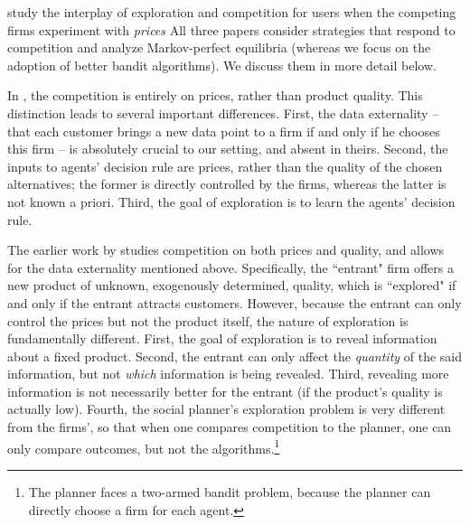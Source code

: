 \citet{bergemann1997market,bergemann2000experimentation,keller2003price} study the interplay of exploration and competition for users when the competing firms experiment with \emph{prices}
All three papers consider strategies that respond to competition and analyze Markov-perfect equilibria (whereas we focus on the adoption of better bandit algorithms). We discuss them in more detail below.

In \citet{keller2003price}, the competition is entirely on prices, rather than product quality. This distinction leads to several important differences. First, the data externality -- that each customer brings a new data point to a firm if and only if he chooses this firm -- is absolutely crucial to our setting, and absent in theirs. Second, the inputs to agents' decision rule are prices, rather than the quality of the chosen alternatives; the former is directly controlled by the firms, whereas the latter is not known a priori. Third, the goal of exploration is to learn the agents' decision rule.

The earlier work by \citet{bergemann1997market,bergemann2000experimentation} studies competition on both prices and quality, and allows for the data externality mentioned above. Specifically, the ``entrant" firm offers a new product of unknown, exogenously determined, quality, which is ``explored" if and only if the entrant attracts customers. However, because the entrant can only control the prices but not the product itself, the nature of exploration is fundamentally different. First, the goal of exploration is to reveal information about a fixed product. Second, the entrant can only affect the \emph{quantity} of the said information, but not \emph{which} information is being revealed. Third, revealing more information is not necessarily better for the entrant (if the product's quality is actually low). Fourth, the social planner's exploration problem is very different from the firms', so that when one compares competition to the planner, one can only compare outcomes, but not the algorithms.\footnote{The planner faces a two-armed bandit problem, because the planner can directly choose a firm for each agent.}




